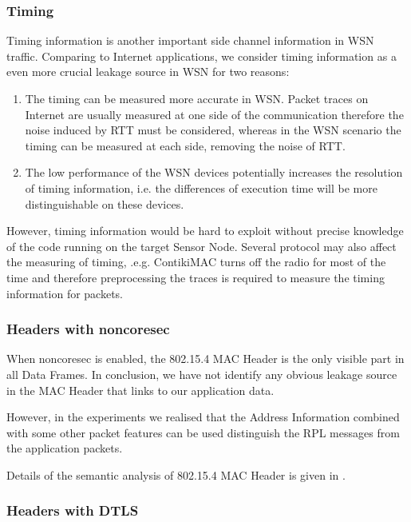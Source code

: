 \subsubsection{Timing}

Timing information is another important side channel information in WSN traffic. Comparing to Internet applications, we consider timing information as a even more crucial leakage source in WSN for two reasons:

\begin{enumerate}
	\item The timing can be measured more accurate in WSN. Packet traces on Internet are usually measured at one side of the communication therefore the noise induced by RTT must be considered, whereas in the WSN scenario the timing can be measured at each side, removing the noise of RTT.
	\item The low performance of the WSN devices potentially increases the resolution of timing information, i.e. the differences of execution time will be more distinguishable on these devices.
\end{enumerate}

However, timing information would be hard to exploit without precise knowledge of the code running on the target Sensor Node. Several protocol may also affect the measuring of timing, .e.g. ContikiMAC turns off the radio for most of the time and therefore preprocessing the traces is required to measure the timing information for packets.

\subsubsection{Headers with noncoresec}

When noncoresec is enabled, the 802.15.4 MAC Header is the only visible part in all Data Frames. In conclusion, we have not identify any obvious leakage source in the MAC Header that links to our application data. 

However, in the experiments we realised that the Address Information combined with some other packet features can be used distinguish the RPL messages from the application packets.

Details of the semantic analysis of 802.15.4 MAC Header is given in . 

\subsubsection{Headers with DTLS}

